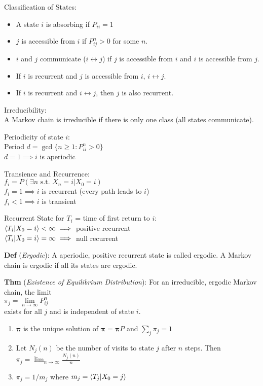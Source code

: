 \documentclass[12pt,landscape]{article}
\newcommand{\tab}{\hspace*{1em}}
\newcommand{\ds}{\displaystyle}
\newcommand{\defn}[1]{\textbf{Def} (\emph{#1})}
\newcommand{\thm}[1]{\textbf{Thm} (\emph{#1})}
\theoremstyle{definition}
\begin{document}
\newpage

\begin{minipage}[t]{0.33\textwidth}
Classification of States:
\begin{itemize}
	\item A state $i$ is absorbing if $P_{ii} = 1$
	\item $j$ is accessible from $i$ if $P_{ij}^n > 0$ for some $n$.
	\item $i$ and $j$ communicate ($i \leftrightarrow j$) if $j$ is accessible from $i$ and $i$ is accessible from $j$.
	\item If $i$ is recurrent and $j$ is accessible from $i$, $i \leftrightarrow j$.
	\item If $i$ is recurrent and $i \leftrightarrow j$, then $j$ is also recurrent.
\end{itemize}

Irreducibility:\\
\tab A Markov chain is irreducible if there is only one class (all states communicate).

Periodicity of state $i$:\\
\tab Period $d = \gcd\{n \geq 1 : P_{ii}^n > 0\}$\\
\tab $d = 1 \implies i$ is aperiodic

Transience and Recurrence:\\
\tab $f_i = P(\exists n \text{ s.t. } X_n = i | X_0 = i)$\\
\tab $f_i = 1 \implies i$ is recurrent (every path leads to $i$)\\
\tab $f_i < 1 \implies i$ is transient

Recurrent State for $T_i$ = time of first return to $i$:\\
\tab $\expval{T_i | X_0 = i} < \infty \implies$ positive recurrent\\
\tab $\expval{T_i | X_0 = i} = \infty \implies$ null recurrent

\defn{Ergodic}: A aperiodic, positive recurrent state is called ergodic. A Markov chain is ergodic if all its states are ergodic.

\thm{Existence of Equilibrium Distribution}: For an irreducible, ergodic Markov chain, the limit\\
\tab $\pi_j = \lim\limits_{n\rightarrow\infty} P_{ij}^n$\\
exists for all $j$ and is independent of state $i$.
\begin{enumerate}
	\item $\boldsymbol{\pi}$ is the unique solution of $\boldsymbol{\pi} = \boldsymbol{\pi}P$ and $\sum_{j} \pi_j = 1$
	\item Let $N_j(n)$ be the number of visits to state $j$ after $n$ steps. Then $\ds \pi_j = \lim_{n\rightarrow\infty} \frac{N_j(n)}{n}$
	\item $\pi_j = 1/m_j$ where $m_j = \expval{T_j | X_0 = j}$
\end{enumerate}


\end{minipage}
\end{document}
